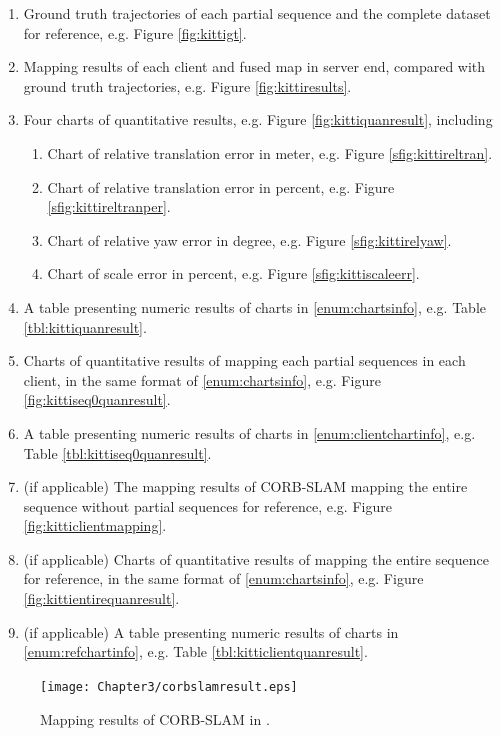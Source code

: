 \begin{enumerate}[1.]
	\item Ground truth trajectories of each partial sequence and the complete dataset for reference, e.g. Figure \ref{fig:kittigt}.
	\item Mapping results of each client and fused map in server end, compared with ground truth trajectories, e.g. Figure \ref{fig:kittiresults}.
	\item Four charts of quantitative results, e.g. Figure \ref{fig:kittiquanresult}, including 
	\label{enum:chartsinfo}
	\begin{enumerate}[1).]
		\item Chart of relative translation error in meter, e.g. Figure \ref{sfig:kittireltran}.
		\item Chart of relative translation error in percent, e.g. Figure \ref{sfig:kittireltranper}.
		\item Chart of relative yaw error in degree, e.g. Figure \ref{sfig:kittirelyaw}.
		\item Chart of scale error in percent, e.g. Figure \ref{sfig:kittiscaleerr}.
	\end{enumerate}
	\item A table presenting numeric results of charts in \ref{enum:chartsinfo}, e.g. Table \ref{tbl:kittiquanresult}.
	\item Charts of quantitative results of mapping each partial sequences in each client, in the same format of \ref{enum:chartsinfo}, e.g. Figure \ref{fig:kittiseq0quanresult}.
	\label{enum:clientchartinfo}
	\item A table presenting numeric results of charts in \ref{enum:clientchartinfo}, e.g. Table \ref{tbl:kittiseq0quanresult}.
	\item (if applicable) The mapping results of CORB-SLAM mapping the entire sequence without partial sequences for reference, e.g. Figure \ref{fig:kitticlientmapping}.
	\item (if applicable) Charts of quantitative results of mapping the entire sequence for reference, in the same format of \ref{enum:chartsinfo}, e.g. Figure \ref{fig:kittientirequanresult}.
	\label{enum:refchartinfo}
	\item (if applicable) A table presenting numeric results of charts in \ref{enum:refchartinfo}, e.g. Table \ref{tbl:kitticlientquanresult}.
\end{enumerate}

\begin{figure}[H]
	\centering
	\texttt{[image: Chapter3/corbslamresult.eps]}
	\caption{Mapping results of CORB-SLAM in \cite{li2017corb}.}
	\label{fig:corbslamresult} 
\end{figure}

